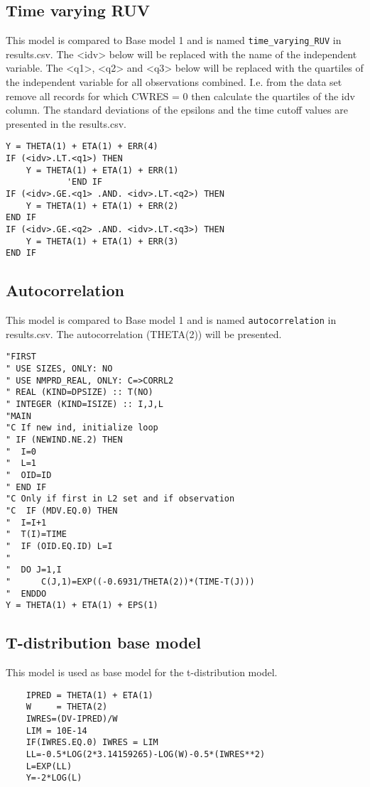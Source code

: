 \subsection{Time varying RUV}
This model is compared to Base model 1 and is named \verb|time_varying_RUV| in results.csv. The <idv> below will be replaced with the name of the independent variable. The <q1>, <q2> and <q3> below will be replaced with the quartiles of the independent variable
for all observations combined. I.e. from the data set remove all records for which CWRES = 0 then calculate the quartiles of the idv column. The standard deviations of the epsilons and the time cutoff values are presented in the results.csv.
\begin{verbatim}
Y = THETA(1) + ETA(1) + ERR(4)
IF (<idv>.LT.<q1>) THEN
    Y = THETA(1) + ETA(1) + ERR(1)
            'END IF
IF (<idv>.GE.<q1> .AND. <idv>.LT.<q2>) THEN
    Y = THETA(1) + ETA(1) + ERR(2)
END IF
IF (<idv>.GE.<q2> .AND. <idv>.LT.<q3>) THEN
    Y = THETA(1) + ETA(1) + ERR(3)
END IF
\end{verbatim}

\subsection{Autocorrelation}
This model is compared to Base model 1 and is named \verb|autocorrelation| in results.csv. The autocorrelation (THETA(2)) will be presented.
\begin{verbatim}
"FIRST
" USE SIZES, ONLY: NO
" USE NMPRD_REAL, ONLY: C=>CORRL2
" REAL (KIND=DPSIZE) :: T(NO)
" INTEGER (KIND=ISIZE) :: I,J,L
"MAIN
"C If new ind, initialize loop
" IF (NEWIND.NE.2) THEN
"  I=0
"  L=1
"  OID=ID
" END IF
"C Only if first in L2 set and if observation
"C  IF (MDV.EQ.0) THEN
"  I=I+1
"  T(I)=TIME
"  IF (OID.EQ.ID) L=I
"
"  DO J=1,I
"      C(J,1)=EXP((-0.6931/THETA(2))*(TIME-T(J)))
"  ENDDO
Y = THETA(1) + ETA(1) + EPS(1)
\end{verbatim}

\subsection{T-distribution base model}
This model is used as base model for the t-distribution model.

\begin{verbatim}
    IPRED = THETA(1) + ETA(1)
	W     = THETA(2)
	IWRES=(DV-IPRED)/W
	LIM = 10E-14
	IF(IWRES.EQ.0) IWRES = LIM
	LL=-0.5*LOG(2*3.14159265)-LOG(W)-0.5*(IWRES**2)
	L=EXP(LL)
	Y=-2*LOG(L)
\end{verbatim}

